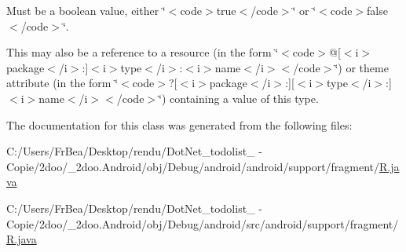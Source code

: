Must be a boolean value, either \char`\"{}$<$code$>$true$<$/code$>$\char`\"{} or \char`\"{}$<$code$>$false$<$/code$>$\char`\"{}. 

This may also be a reference to a resource (in the form \char`\"{}$<$code$>$@\mbox{[}$<$i$>$package$<$/i$>$:\mbox{]}$<$i$>$type$<$/i$>$:$<$i$>$name$<$/i$>$$<$/code$>$\char`\"{}) or theme attribute (in the form \char`\"{}$<$code$>$?\mbox{[}$<$i$>$package$<$/i$>$:\mbox{]}\mbox{[}$<$i$>$type$<$/i$>$:\mbox{]}$<$i$>$name$<$/i$>$$<$/code$>$\char`\"{}) containing a value of this type. 

The documentation for this class was generated from the following files:\begin{CompactItemize}
\item 
C:/Users/FrBea/Desktop/rendu/DotNet\_\-todolist\_ - Copie/2doo/\_\-2doo.Android/obj/Debug/android/android/support/fragment/\hyperlink{android_2support_2fragment_2_r_8java}{R.java}\item 
C:/Users/FrBea/Desktop/rendu/DotNet\_\-todolist\_ - Copie/2doo/\_\-2doo.Android/obj/Debug/android/src/android/support/fragment/\hyperlink{src_2android_2support_2fragment_2_r_8java}{R.java}\end{CompactItemize}
